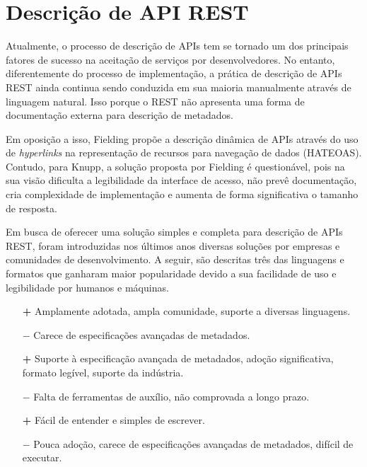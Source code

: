 \section[Descrição de API REST]{Descrição de API REST}

Atualmente, o processo de descrição de APIs tem se tornado um dos principais fatores de sucesso na aceitação de serviços por desenvolvedores. No entanto, diferentemente do processo de implementação, a prática de descrição de APIs REST ainda continua sendo conduzida em sua maioria manualmente através de linguagem natural. Isso porque o REST não apresenta uma forma de documentação externa para descrição de metadados. \cite{LuckyEtAl2016}

Em oposição a isso, Fielding propõe a descrição dinâmica de APIs através do uso de \textit{hyperlinks} na representação de recursos para navegação de dados (HATEOAS). Contudo, para Knupp, a solução proposta por Fielding é questionável, pois na sua visão dificulta a legibilidade da interface de acesso, não prevê documentação, cria complexidade de implementação e aumenta de forma significativa o tamanho de resposta. \cite{Knupp2016}

Em busca de oferecer uma solução simples e completa para descrição de APIs REST, foram introduzidas nos últimos anos diversas soluções por empresas e comunidades de desenvolvimento. A seguir, são descritas três das linguagens e formatos que ganharam maior popularidade devido a sua facilidade de uso e legibilidade por humanos e máquinas. \cite{Sandoval2015}

\begin{description}[leftmargin=8em,style=nextline]
  \item[\textbf{OpenAPI}]
    \begin{enumerate}
        \item[\textbf{+}] Amplamente adotada, ampla comunidade, suporte a diversas linguagens.
        \item[\textbf{$-$}] Carece de especificações avançadas de metadados.
    \end{enumerate}
  \item[\textbf{RAML}]
    \begin{enumerate}
      \item[\textbf{+}] Suporte à especificação avançada de metadados, adoção significativa, formato legível, suporte da indústria.
       \item[\textbf{$-$}] Falta de ferramentas de auxílio, não comprovada a longo prazo.
    \end{enumerate}
  \item[\textbf{API Blueprint}]
    \begin{enumerate}
      \item[\textbf{+}] Fácil de entender e simples de escrever.
       \item[\textbf{$-$}] Pouca adoção, carece de especificações avançadas de metadados, difícil de executar.
    \end{enumerate}
\end{description}

